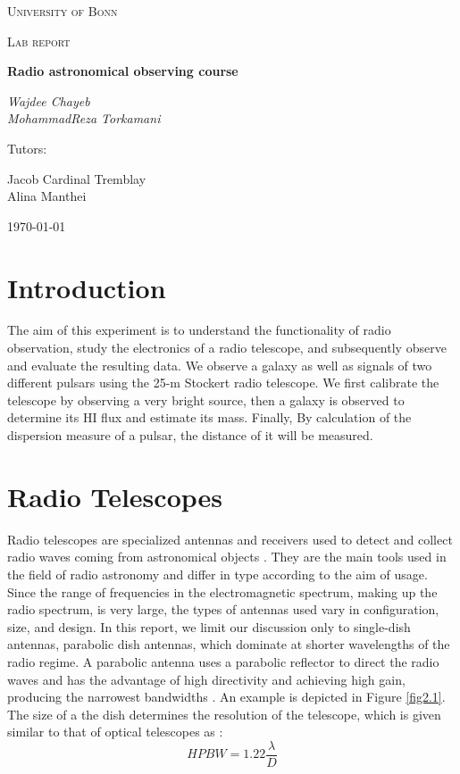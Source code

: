 \documentclass[12pt]{article}
\begin{document}
\begin{titlepage}
	\centering
	{\textsc{University of Bonn} \par}
	\vspace{1cm}
	{\Large \textsc{Lab report}\par}
	\vspace{1.5cm}
	{\huge\bfseries Radio astronomical observing course\par}
	\vspace{2cm}
	{\Large\itshape Wajdee Chayeb \\
	MohammadReza Torkamani\par}
	\vfill
	Tutors:\par
	Jacob Cardinal Tremblay\\
	Alina Manthei

	\vfill

	{\large \today\par}
\end{titlepage}

\section{Introduction}
The aim of this experiment is to understand the functionality of radio observation, study the electronics of a radio telescope, and subsequently observe and evaluate the resulting data. 
We observe a galaxy as well as signals of two different pulsars using the 25-m Stockert radio telescope. We first calibrate the telescope by observing a very bright source, then a galaxy is observed to determine its HI flux and estimate its mass. Finally, By calculation of the dispersion measure of a pulsar, the distance of it will be measured.

\section{Radio Telescopes}
Radio telescopes are specialized antennas and receivers used to detect and collect radio waves coming from astronomical objects \cite{fundamentals}. They are the main tools used in the field of radio astronomy and differ in type according to the aim of usage.  Since the range of frequencies in the electromagnetic spectrum, making up the radio spectrum, is very large, the types of antennas used vary in configuration, size, and design. In this report, we limit our discussion only to single-dish antennas, parabolic dish antennas, which dominate at shorter wavelengths of the radio regime. A parabolic antenna uses a parabolic reflector to direct the radio waves and has the advantage of high directivity and achieving high gain, producing the narrowest bandwidths \cite{antennabook}. An example is depicted in Figure \ref{fig2.1}. The size of a the dish determines the resolution of the telescope, which is given similar to that of optical telescopes as \cite{lecturenote}:
\begin{equation}
    HPBW = 1.22 \frac{\lambda}{D}
\end{equation}
\end{document}
